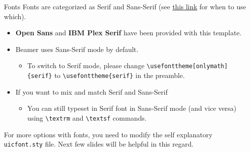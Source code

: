 \documentclass{beamer}
\newcommand{\hrefcol}[2]{\textcolor{uihteal}{\href{#1}{#2}}}
\begin{document}


\begin{frame}[fragile]{Fonts}
Fonts are categorized as \textrm{Serif} and \textsf{Sans-Serif} (see \hrefcol{https://www.adobe.com/creativecloud/design/discover/serif-vs-sans-serif.html}{this link} for when to use which).

\begin{itemize}
    \item \textbf{\textsf{Open Sans}} and \textbf{\textrm{IBM Plex Serif}} have been provided with this template.
    \item Beamer uses \textsf{Sans-Serif} mode by default.
    \begin{itemize}
        \item To switch to Serif mode, please change \verb|\usefonttheme[onlymath]{serif}| to \verb|\usefonttheme{serif}| in the preamble.
    \end{itemize}
    \item If you want to mix and match Serif and Sans-Serif
    \begin{itemize}
        \item You can still typeset in Serif font in Sans-Serif mode (and vice versa) using \verb|\textrm| and \verb|\textsf| commands.
    \end{itemize}
\end{itemize}
For more options with fonts, you need to modify the self explanatory \verb|uicfont.sty| file. Next few slides will be helpful in this regard.
\end{frame}
\end{document}
